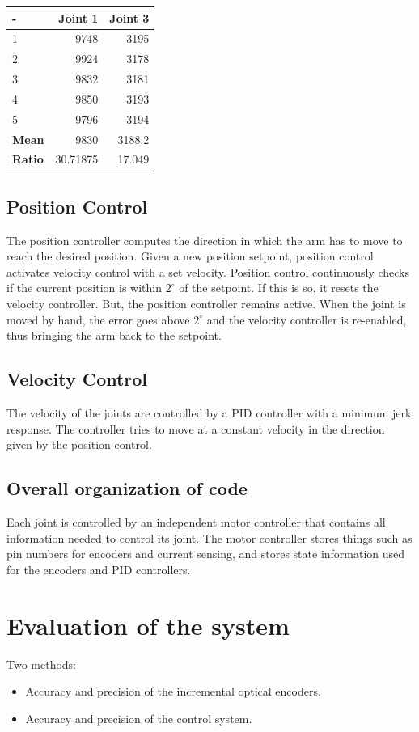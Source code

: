 \documentclass[10pt,a4paper]{article}
\begin{document}
\begin{tabular}{ | l | r | r |}
\hline
- & \textbf{Joint 1} & \textbf{Joint 3} \\
\hline
1 & 9748 & 3195 \\
\hline
2 & 9924 & 3178 \\
\hline
3 & 9832 & 3181 \\
\hline
4 & 9850 & 3193 \\
\hline
5 & 9796 & 3194 \\
\hline
\textbf{Mean} & 9830 & 3188.2 \\
\hline
\textbf{Ratio} & 30.71875 & 17.049 \\
\hline

\end{tabular}

\subsection{Position Control}
The position controller computes the direction in which the arm has to
move to reach the desired position. Given a new position setpoint,
position control activates velocity control with a set
velocity. Position control continuously checks if the current position
is within \( 2^{\circ}\) of the setpoint. If this is so, it resets the
velocity controller. But, the position controller remains active. When
the joint is moved by hand, the error goes above $ 2^{\circ} $ and the
velocity controller is re-enabled, thus bringing the arm back to the
setpoint. 

\subsection{Velocity Control}
The velocity of the joints are controlled by a PID controller with a
minimum jerk response. The controller tries to move at a constant
velocity in the direction given by the position control.

\subsection{Overall organization of code}
Each joint is controlled by an independent motor controller that
contains all information needed to control its joint. The motor
controller stores things such as pin numbers for encoders and current
sensing, and stores state information used for the encoders and PID
controllers.

\section{Evaluation of the system}
Two methods:
\begin{itemize}
\item Accuracy and precision of the incremental optical encoders.
\item Accuracy and precision of the control system.
\end{itemize}
\end{document}
